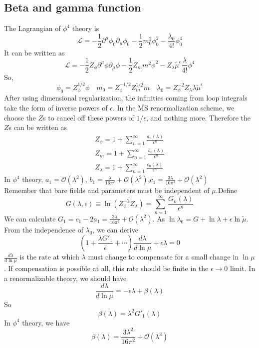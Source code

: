 \subsection{Beta and gamma function}
\noindent
The Lagrangian of $\phi^4$ theory is 
\[\mathcal{L} = -\frac{1}{2} \partial^{\mu} \phi_0 \partial_{\mu} \phi_0 -\frac{1}{2}m_0^2 \phi_0^2 - \frac{\lambda_0}{4!}\phi_0^4\]
It can be written as
\[\mathcal{L} = -\frac{1}{2}Z_{\phi} \partial^{\mu} \phi \partial_{\mu} \phi -\frac{1}{2}Z_{m}m^2 \phi^2 - Z_{\lambda} \tilde{\mu}^{\epsilon}\frac{\lambda}{4!}\phi^4\]
So, 
\[\phi_0 = Z_{\phi}^{1/2}\phi \quad m_0 = Z_{\phi}^{-1/2} Z_{m}^{1/2}m \quad \lambda_0 = Z_{\phi}^{-2} Z_{\lambda} \lambda \tilde{\mu}^{\epsilon}\]
After using dimensional regularization, the infinities coming from loop integrals take the form of inverse powers of $\epsilon$. In the  $\mathrm{\overline{MS}}$ renormalization scheme, we choose the $Z$s to cancel off these powers of $1/\epsilon$, and nothing more. Therefore the $Z$s can be written as
\begin{eqnarray}
Z_{\phi} = 1 + \sum_{n=1}^{\infty} \frac{a_n(\lambda)}{\epsilon^n} \nonumber \\
Z_{m} = 1 + \sum_{n=1}^{\infty} \frac{b_n(\lambda)}{\epsilon^n} \nonumber \\
Z_{\lambda} = 1 + \sum_{n=1}^{\infty} \frac{c_n(\lambda)}{\epsilon^n} \nonumber 
\end{eqnarray}
In $\phi^4$ theory, $a_1 = \mathcal{O}(\lambda^2)$, $b_1 = \frac{\lambda}{16\pi^2} +  \mathcal{O}(\lambda^2)$,$c_1 = \frac{3\lambda}{16\pi^2} + \mathcal{O}(\lambda^2)$\\
Remember that bare fields and parameters must be independent of $\mu$.Define
\[G(\lambda,\epsilon) \equiv \ln(Z_{\phi}^{-2} Z_{\lambda}) = \sum_{n=1}^{\infty} \frac{G_n(\lambda)}{\epsilon^n}\]
We can calculate $G_1 = c_1 - 2a_1 = \frac{3\lambda}{16\pi^2} + \mathcal{O}(\lambda^2)$.
As $\ln \lambda_0 = G + \ln \lambda + \epsilon \ln \tilde{\mu} $. From the independence of $\lambda_0$, we can derive
\[\left ( 1 + \frac{\lambda G'_1}{\epsilon} + \cdots \right) \frac{d\lambda}{d\ln \mu} + \epsilon \lambda = 0\]
$\frac{d\lambda}{d\ln\mu}$ is the rate at which $\lambda$ must change to compensate for a small change in $\ln \mu$. If compensation is possible at all, this rate should be finite in the $\epsilon \to 0$ limit. In a renormalizable theory, we should have
\[\frac{d\lambda}{d\ln\mu} = -\epsilon\lambda + \beta(\lambda)\]
So
\[\beta(\lambda) = \lambda^2 G'_1(\lambda)\]
In $\phi^4$ theory, we have
\[\beta(\lambda) = \frac{3\lambda^2}{16\pi^2} + \mathcal{O}(\lambda^3)\]
